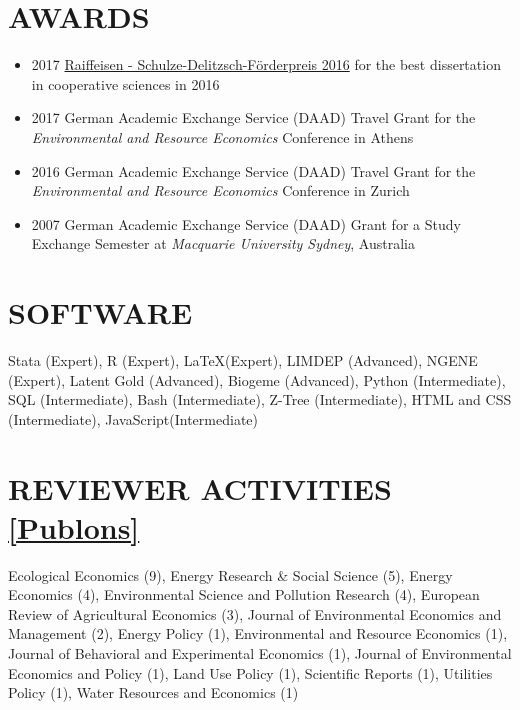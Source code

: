 \documentclass[paper=a4,fontsize=11pt]{scrartcl} %
\newcommand{\NewPart}[2]{\section*{\uppercase{#1} #2}}
\begin{document}
 \NewPart{Awards}{}
 \begin{itemize}
 
 
\item 2017 \href{https://www.agrar.hu-berlin.de/de/institut/departments/daoe/koopwiss/ifg/forschung/wissenschaftlicher-nachwuchs/raiffeisen-schulze-delitzsch-foerderpreis}{Raiffeisen - Schulze-Delitzsch-Förderpreis 2016} for the best dissertation in cooperative sciences in 2016
 \item 2017 German Academic Exchange Service (DAAD) Travel Grant for the \textit{Environmental and Resource Economics} Conference in Athens
 \item 2016 German Academic Exchange Service (DAAD) Travel Grant for the \textit{Environmental and Resource Economics} Conference in Zurich
 \item 2007 German Academic Exchange Service (DAAD) Grant for a Study Exchange Semester at \textit{Macquarie University Sydney}, Australia

\end{itemize}





\NewPart{Software}{}
Stata (Expert), R (Expert), \LaTeX (Expert),  LIMDEP (Advanced), NGENE (Expert), Latent Gold (Advanced), Biogeme (Advanced), Python (Intermediate), SQL (Intermediate), Bash (Intermediate), Z-Tree (Intermediate), HTML and CSS (Intermediate), JavaScript(Intermediate)

\NewPart{Reviewer Activities}{\href{https://publons.com/a/1337890}{[Publons]}}
Ecological Economics (9), Energy Research \& Social Science (5), 
Energy Economics (4), 
Environmental Science and Pollution Research (4),
European Review of Agricultural Economics (3), Journal of Environmental Economics and Management 
(2), 
Energy Policy (1),
 Environmental and Resource Economics (1), Journal of Behavioral and Experimental Economics (1), 
 Journal of Environmental Economics and Policy
(1), Land Use Policy
(1), Scientific Reports
(1), Utilities Policy
(1), Water Resources and Economics (1)
\end{document}
